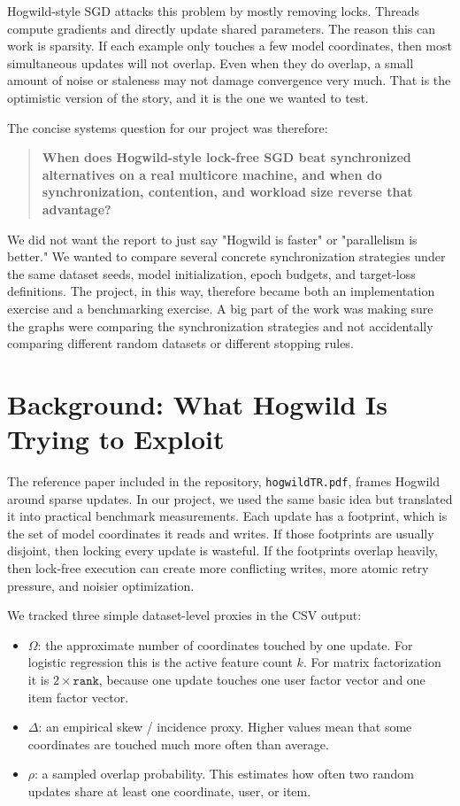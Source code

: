 \documentclass[11pt]{article}
\begin{document}
Hogwild-style SGD attacks this problem by mostly removing locks. Threads compute gradients and directly update shared parameters. The reason this can work is sparsity. If each example only touches a few model coordinates, then most simultaneous updates will not overlap. Even when they do overlap, a small amount of noise or staleness may not damage convergence very much. That is the optimistic version of the story, and it is the one we wanted to test.

The concise systems question for our project was therefore:

\begin{quote}
\textbf{When does Hogwild-style lock-free SGD beat synchronized alternatives on a real multicore machine, and when do synchronization, contention, and workload size reverse that advantage?}
\end{quote}

We did not want the report to just say "Hogwild is faster" or "parallelism is better." We wanted to compare several concrete synchronization strategies under the same dataset seeds, model initialization, epoch budgets, and target-loss definitions. The project, in this way, therefore became both an implementation exercise and a benchmarking exercise. A big part of the work was making sure the graphs were comparing the synchronization strategies and not accidentally comparing different random datasets or different stopping rules.

\section{Background: What Hogwild Is Trying to Exploit}

The reference paper included in the repository, \texttt{hogwildTR.pdf}, frames Hogwild around sparse updates. In our project, we used the same basic idea but translated it into practical benchmark measurements. Each update has a footprint, which is the set of model coordinates it reads and writes. If those footprints are usually disjoint, then locking every update is wasteful. If the footprints overlap heavily, then lock-free execution can create more conflicting writes, more atomic retry pressure, and noisier optimization.

We tracked three simple dataset-level proxies in the CSV output:

\begin{itemize}
  \item \(\Omega\): the approximate number of coordinates touched by one update. For logistic regression this is the active feature count \(k\). For matrix factorization it is \(2 \times \texttt{rank}\), because one update touches one user factor vector and one item factor vector.
  \item \(\Delta\): an empirical skew / incidence proxy. Higher values mean that some coordinates are touched much more often than average.
  \item \(\rho\): a sampled overlap probability. This estimates how often two random updates share at least one coordinate, user, or item.
\end{itemize}
\end{document}
